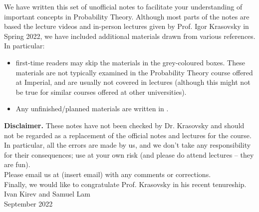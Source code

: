 \thispagestyle{empty}
We have written this set of unofficial notes to facilitate your understanding of important concepts in Probability Theory. Although most parts of the notes are based the lecture videos and in-person lectures given by Prof. Igor Krasovsky in Spring 2022, we have included additional materials drawn from various references. In particular: 

\begin{unexaminable}
\begin{itemize}
    \item first-time readers may skip the materials in the grey-coloured boxes. These materials are not typically examined in the Probability Theory course offered at Imperial, and are usually not covered in lectures (although this might not be true for similar courses offered at other universities).
\end{itemize}
\end{unexaminable}
\begin{itemize}
    \item Any unfinished/planned materials are written in .
\end{itemize}

\textbf{Disclaimer.} These notes have not been checked by Dr. Krasovsky and should not be regarded as a replacement of the official notes and lectures for the course. In particular, all the errors are made by us, and we don't take any responsibility for their consequences; use at your own risk (and please do attend lectures -- they are fun). \\

Please email us at (insert email) with any comments or corrections.\\

Finally, we would like to congratulate Prof. Krasovsky in his recent tenureship.\\

Ivan Kirev and Samuel Lam \\
September 2022

\newpage 

\tableofcontents
\newpage

\pagestyle{fancy}

